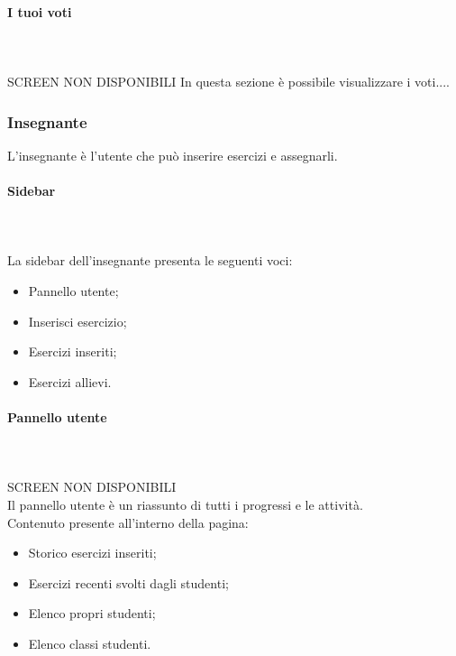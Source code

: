        \paragraph{I tuoi voti}\mbox{}\\ \\
        SCREEN NON DISPONIBILI
        In questa sezione è possibile visualizzare i voti....

    \subsubsection{Insegnante}
    L'insegnante è l'utente che può inserire esercizi e assegnarli.
        \paragraph{Sidebar}\mbox{}\\ \\
        La sidebar dell'insegnante presenta le seguenti voci:
        \begin{itemize}
            \item Pannello utente;
            \item Inserisci esercizio;
            \item Esercizi inseriti;
            \item Esercizi allievi.
        \end{itemize}
        \paragraph{Pannello utente}\mbox{}\\ \\
        SCREEN NON DISPONIBILI
        \\Il pannello utente è un riassunto di tutti i progressi e le attività.
        \\Contenuto presente all'interno della pagina:
        \begin{itemize}
        \item Storico esercizi inseriti; 
        \item Esercizi recenti svolti dagli studenti;
        \item Elenco propri studenti;
        \item Elenco classi studenti.
        \end{itemize}
